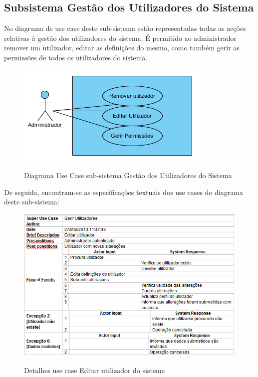 \documentclass[12pt,a4paper]{article}
\begin{document}
\clearpage

\subsection{Subsistema Gestão dos Utilizadores do Sistema}
No diagrama de use case deste sub-sistema estão representadas todas as acções relativas
à gestão dos utilizadores do sistema. É permitido ao administrador remover um utilizador, editar as definições do mesmo, como também gerir as permissões de todos os utilizadores do sistema. \\

\begin{figure}[h!]
\centering
\includegraphics[scale=1]{usecase/A_GerirUtilizadores}
\label{usecase}
\caption{Diagrama Use Case sub-sistema Gestão dos Utilizadores do Sistema}
\end{figure}

De seguida, encontram-se as especificações textuais dos use cases do diagrama deste sub-sistema:\\

\begin{figure}[h!]
\centering
\includegraphics[scale=0.7]{d_usecase/A_editarutilizador}
\label{usecase}
\caption{Detalhes use case Editar utilizador do sistema}
\end{figure}
\end{document}
